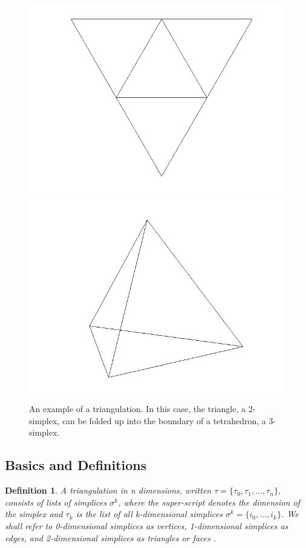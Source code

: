 \documentclass[12pt]{article}
\newtheorem{definition}[theorem]{Definition}
\begin{document}
\begin{figure}
\includegraphics[scale = 0.5]{Pictures/flattetrahedron.png}
\includegraphics[scale = 0.3]{Pictures/tetrahedron.jpg}
\caption{An example of a triangulation. In this case, the triangle, a 2-simplex, can be folded up into the boundary of a tetrahedron, a 3-simplex.}
\end{figure}

\subsection{Basics and Definitions}
\label{BaD}

\begin{definition}
\label{tridef}
A triangulation in \textit{n} dimensions, written $\tau = \{\tau_0, \tau_1, ... , \tau_n\}$, consists of lists of simplices $\sigma^k$, where the super-script denotes the dimension of the simplex and $\tau_k$ is the list of all \textit{k}-dimensional simplices $\sigma^k = \{i_0, ... , i_k\}$. We shall refer to 0-dimensional simplices as vertices, 1-dimensional simplices as edges, and 2-dimensional simplices as triangles or faces \cite{Dave}.
\end{definition}
\end{document}

